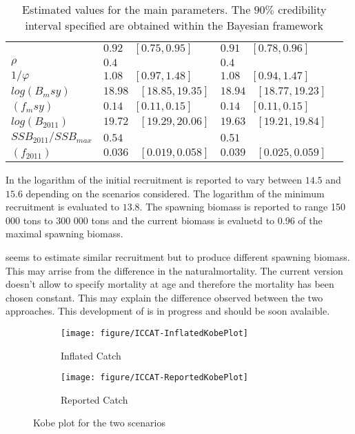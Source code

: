 \begin{table}
\begin{tabular}{p{2.1cm}p{4cm}p{4cm}p{4cm}}
{$h$  & $0.92\quad [0.75, 0.95]$ & $0.91\quad[0.78, 0.96]$\\ 
$\rho$ &    $0.4$ & $0.4$	\\ 
$1/\varphi$  & $1.08\quad [0.97 ,1.48]$ & $1.08\quad[0.94, 1.47]$\\
$log(B_msy)$ &  $18.98\quad [18.85, 19.35]$ & $18.94\quad[18.77,19.23] $\\
$(f_msy)$   & $0.14\quad [0.11, 0.15]$ & $0.14\quad[0.11, 0.15]$\\
$log(B_{2011})$   & $19.72\quad[19.29, 20.06]$ & $19.63\quad[19.21, 19.84]$\\
$SSB_{2011}/SSB_{max}$   &  $0.54$   & $0.51$ \\
$(f_{2011})$ & $0.036\quad[0.019, 0.058]$  &   $0.039\quad[0.025, 0.059]$ \\ \hline\hline
\end{tabular}
\caption{Estimated values for the main parameters. The $90\%$ credibility interval specified are obtained within the Bayesian framework}
\label{[table:mleRinit}
\end{table}


In \cite{tuna2012} the logarithm of the initial recruitment is reported to vary between $14.5$ and $15.6$ depending on the scenarios considered.
The logarithm of the minimum recruitment is evaluated to $13.8$. The spawning biomass is reported to range 150 000 tons to 300 000 tons and the 
current biomass is evaluetd to 0.96 of the maximal spawning biomass.

\iscam seems to estimate similar recruitment but to produce different spawning biomass. This may arrise from the difference in the naturalmortality.
The current \iscam version doesn't allow to specify mortality at age and therefore the mortality has been chosen constant. 
This may explain the difference observed between the two approaches. This development of \iscam is in progress and should be soon avalaible.





\begin{figure}
 \begin{subfigure}[b]{\textwidth}
  \texttt{[image: figure/ICCAT-InflatedKobePlot]} 
  \caption{Inflated Catch}
  \end{subfigure}
 \begin{subfigure}[b]{\textwidth}
  \texttt{[image: figure/ICCAT-ReportedKobePlot]} 
	\caption{Reported Catch}
  \end{subfigure}
\caption{Kobe plot for the two scenarios}
\end{figure}

